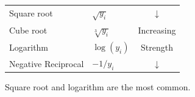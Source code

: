 \documentclass[a4paper,11pt,oneside,onecolumn]{book}
\begin{document}
\vspace{.5cm}

\begin{center}
\begin{tabular}{llc} \hline
Square root & $\sqrt{y_i}$ & $\downarrow$ \\
Cube root   & $\sqrt[3]{y_i}$ & Increasing \\
Logarithm   & $\log(y_i)$ & Strength \\
Negative Reciprocal & $-1/y_i$ & $\downarrow$ \\ \hline
\end{tabular}
\end{center}

\vspace{.5cm}

Square root and logarithm are the most common.

\vspace{.5cm}
\end{document}
